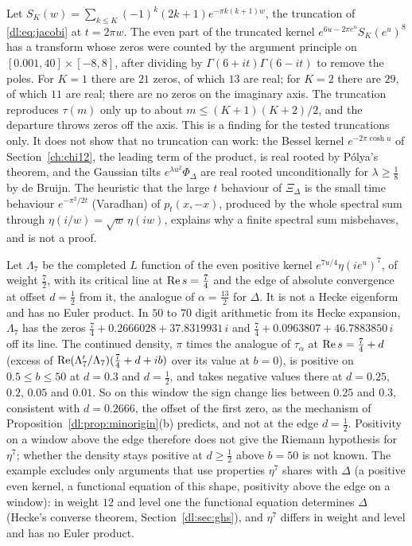 \begin{remark}\label{dl:rem:trunc}
Let $S_K(w)=\sum_{k\le K}(-1)^k(2k+1)e^{-\pi k(k+1)w}$, the truncation of \eqref{dl:eq:jacobi} at $t=2\pi w$. The even part of the truncated kernel $e^{6u-2\pi e^u}S_K(e^u)^8$ has a transform whose zeros were counted by the argument principle on $[0.001,40]\times[-8,8]$, after dividing by $\Gamma(6+it)\Gamma(6-it)$ to remove the poles. For $K=1$ there are $21$ zeros, of which $13$ are real; for $K=2$ there are $29$, of which $11$ are real; there are no zeros on the imaginary axis. The truncation reproduces $\tau(m)$ only up to about $m\le(K+1)(K+2)/2$, and the departure throws zeros off the axis. This is a finding for the tested truncations only. It does not show that no truncation can work: the Bessel kernel $e^{-2\pi\cosh u}$ of Section~\ref{ch:chi12}, the leading term of the product, is real rooted by P\'olya's theorem, and the Gaussian tilts $e^{\lambda u^2}\Phi_\Delta$ are real rooted unconditionally for $\lambda\ge\frac18$ by de Bruijn. The heuristic that the large $t$ behaviour of $\Xi_\Delta$ is the small time behaviour $e^{-\pi^2/2t}$ (Varadhan) of $p_t(x,-x)$, produced by the whole spectral sum through $\eta(i/w)=\sqrt w\,\eta(iw)$, explains why a finite spectral sum misbehaves, and is not a proof.
\end{remark}

\begin{remark}\label{dl:rem:eta7}
Let $\Lambda_7$ be the completed $L$ function of the even positive kernel $e^{7u/4}\eta(ie^u)^7$, of weight $\frac72$, with its critical line at $\operatorname{Re} s=\frac74$ and the edge of absolute convergence at offset $d=\frac12$ from it, the analogue of $\alpha=\frac{13}2$ for $\Delta$. It is not a Hecke eigenform and has no Euler product. In $50$ to $70$ digit arithmetic from its Hecke expansion, $\Lambda_7$ has the zeros $\frac74+0.2666028+37.8319931\,i$ and $\frac74+0.0963807+46.7883850\,i$ off its line. The continued density, $\pi$ times the analogue of $\tau_\alpha$ at $\operatorname{Re} s=\frac74+d$ (excess of $\operatorname{Re}(\Lambda_7'/\Lambda_7)(\frac74+d+ib)$ over its value at $b=0$), is positive on $0.5\le b\le50$ at $d=0.3$ and $d=\frac12$, and takes negative values there at $d=0.25$, $0.2$, $0.05$ and $0.01$. So on this window the sign change lies between $0.25$ and $0.3$, consistent with $d=0.2666$, the offset of the first zero, as the mechanism of Proposition~\ref{dl:prop:minorigin}(b) predicts, and not at the edge $d=\frac12$. Positivity on a window above the edge therefore does not give the Riemann hypothesis for $\eta^7$; whether the density stays positive at $d\ge\frac12$ above $b=50$ is not known. The example excludes only arguments that use properties $\eta^7$ shares with $\Delta$ (a positive even kernel, a functional equation of this shape, positivity above the edge on a window): in weight $12$ and level one the functional equation determines $\Delta$ (Hecke's converse theorem, Section~\ref{dl:sec:ghs}), and $\eta^7$ differs in weight and level and has no Euler product.
\end{remark}

